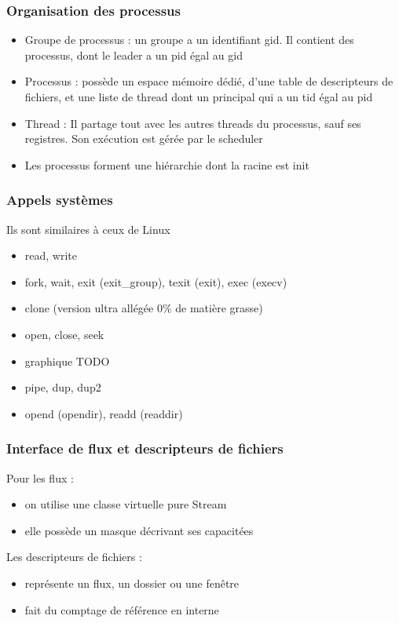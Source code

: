 \documentclass[aspectration=43]{beamer}
\begin{document}
\begin{frame}
    \frametitle{Organisation des processus}
    \begin{itemize}
        \item Groupe de processus : un groupe a un identifiant gid. Il contient des processus, dont le leader a un pid égal au gid
        \item Processus : possède un espace mémoire dédié, d'une table de descripteurs de fichiers, et une liste de thread dont un principal qui a un tid égal au pid
        \item Thread : Il partage tout avec les autres threads du processus, sauf ses registres. Son exécution est gérée par le scheduler
        \item Les processus forment une hiérarchie dont la racine est init
    \end{itemize}
\end{frame}

\begin{frame}
    \frametitle{Appels systèmes}
    Ils sont similaires à ceux de Linux
    \begin{itemize}
        \item read, write
        \item fork, wait, exit (exit\_group), texit (exit), exec (execv)
        \item clone (version ultra allégée 0\% de matière grasse)
        \item open, close, seek
        \item graphique TODO
        \item pipe, dup, dup2
        \item opend (opendir), readd (readdir)
    \end{itemize}
\end{frame}

\begin{frame}
    \frametitle{Interface de flux et descripteurs de fichiers}
    Pour les flux :
    \begin{itemize}
        \item on utilise une classe virtuelle pure Stream
        \item elle possède un masque décrivant ses capacitées
    \end{itemize}
    Les descripteurs de fichiers :
    \begin{itemize}
        \item représente un flux, un dossier ou une fenêtre
        \item fait du comptage de référence en interne
    \end{itemize}
\end{frame}
\end{document}
